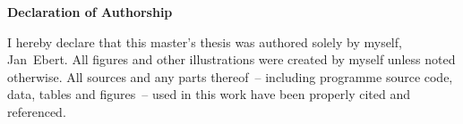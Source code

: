 
\maketitle


\setcounter{page}{2}
\thispagestyle{empty}
\noindent
\textbf{Declaration of Authorship} \medskip

\noindent
I hereby declare that this master's thesis was authored solely by
myself, Jan~Ebert. All figures and other illustrations were created by
myself unless noted otherwise. All sources and any parts thereof~--
including programme source code, data, tables and figures~-- used in
this work have been properly cited and referenced.

\bigskip
\bigskip
\noindent
\makebox[3cm]{\hrulefill} \hspace{0.2cm} \makebox[4cm]{\hrulefill}

\noindent
{} \hspace{0.2cm} 


\begin{abstract}
\setcounter{page}{3}
\end{abstract}


\setcounter{page}{4}
\thispagestyle{empty}
\tableofcontents

\newpage




